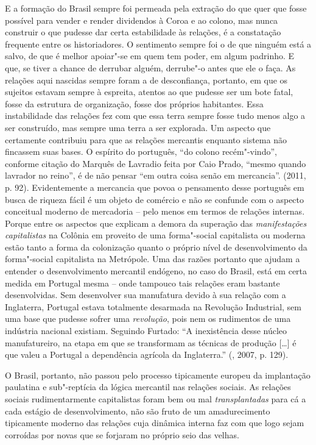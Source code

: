 E a formação do Brasil sempre foi permeada pela extração do que quer que
fosse possível para vender e render dividendos à Coroa e ao colono, mas
nunca construir o que pudesse dar certa estabilidade às relações, é a
constatação frequente entre os historiadores. O sentimento sempre foi o
de que ninguém está a salvo, de que é melhor apoiar"-se em quem tem
poder, em algum padrinho. E que, se tiver a chance de derrubar alguém,
derrube"-o antes que ele o faça. As relações aqui nascidas sempre foram a
de desconfiança, portanto, em que os sujeitos estavam sempre à espreita,
atentos ao que pudesse ser um bote fatal, fosse da estrutura de
organização, fosse dos próprios habitantes. Essa instabilidade das
relações fez com que essa terra sempre fosse tudo menos algo a ser
construído, mas sempre uma terra a ser explorada. Um aspecto que
certamente contribuiu para que as relações mercantis enquanto sistema
não fincassem suas bases. O espírito do português, ``do colono
recém"-vindo'', conforme citação do Marquês de Lavradio feita por Caio
Prado, ``mesmo quando lavrador no reino'', é de não pensar ``em outra
coisa senão em mercancia''. (2011, p. 92). Evidentemente a mercancia que
povoa o pensamento desse português em busca de riqueza fácil é um objeto
de comércio e não se confunde com o aspecto conceitual moderno de
mercadoria -- pelo menos em termos de relações internas. Porque entre os
aspectos que explicam a demora da superação das \emph{manifestações
capitalistas} na Colônia em proveito de uma forma"-social capitalista ou
moderna estão tanto a forma da colonização quanto o próprio nível de
desenvolvimento da forma"-social capitalista na Metrópole. Uma das razões
portanto que ajudam a entender o desenvolvimento mercantil endógeno, no
caso do Brasil, está em certa medida em Portugal mesma -- onde tampouco
tais relações eram bastante desenvolvidas. Sem desenvolver sua
manufatura devido à sua relação com a Inglaterra, Portugal estava
totalmente desarmada na Revolução Industrial, sem uma base que pudesse
sofrer uma \emph{revolução}, pois nem os rudimentos de uma indústria
nacional existiam. Seguindo Furtado: ``A inexistência desse núcleo
manufatureiro, na etapa em que se transformam as técnicas de produção
[\ldots{}] é que valeu a Portugal a dependência agrícola da Inglaterra.''
(, 2007, p. 129).

O Brasil, portanto, não passou pelo processo tipicamente europeu da
implantação paulatina e sub"-reptícia da lógica mercantil nas relações
sociais. As relações sociais rudimentarmente capitalistas foram bem ou
mal \emph{transplantadas} para cá a cada estágio de desenvolvimento, não
são fruto de um amadurecimento tipicamente moderno das relações cuja
dinâmica interna faz com que logo sejam corroídas por novas que se
forjaram no próprio seio das velhas.

